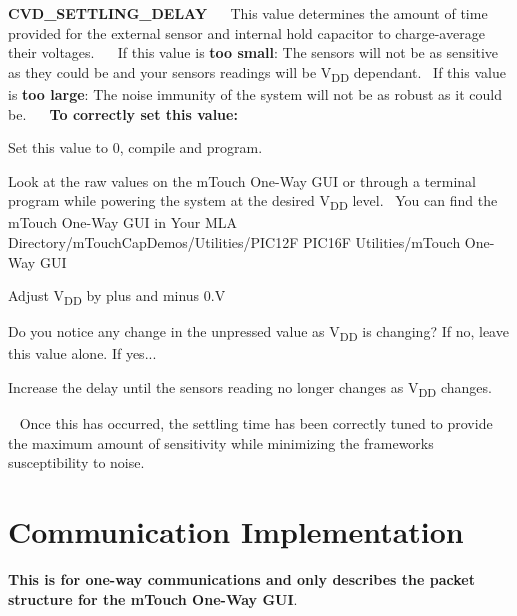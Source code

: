\begin{DoxyItemize}
\item {\bfseries C\+V\+D\+\_\+\+S\+E\+T\+T\+L\+I\+N\+G\+\_\+\+D\+E\+L\+A\+Y}~\newline
~\newline
 This value determines the amount of time provided for the external sensor and internal hold capacitor to charge-\/average their voltages.~\newline
~\newline
 If this value is {\bfseries too small}\+: The sensors will not be as sensitive as they could be and your sensor\textquotesingle{}s readings will be V\textsubscript{D\+D} dependant.~\newline
 If this value is {\bfseries too large}\+: The noise immunity of the system will not be as robust as it could be.~\newline
~\newline
 {\bfseries To correctly set this value\+:} 
\begin{DoxyEnumerate}
\item Set this value to 0, compile and program. 
\item Look at the raw values on the m\+Touch One-\/\+Way G\+U\+I or through a terminal program while powering the system at the desired V\textsubscript{D\+D} level.~\newline
 You can find the m\+Touch One-\/\+Way G\+U\+I in {\ttfamily Your M\+L\+A Directory/m\+Touch\+Cap\+Demos/\+Utilities/\+P\+I\+C12\+F P\+I\+C16\+F Utilities/m\+Touch One-\/\+Way G\+U\+I} 
\item Adjust V\textsubscript{D\+D} by plus and minus 0.\+V 
\begin{DoxyItemize}
\item Do you notice any change in the unpressed value as V\textsubscript{D\+D} is changing? If no, leave this value alone. If yes... 
\end{DoxyItemize}
\item Increase the delay until the sensor\textquotesingle{}s reading no longer changes as V\textsubscript{D\+D} changes. 
\end{DoxyEnumerate}~\newline
 Once this has occurred, the settling time has been correctly tuned to provide the maximum amount of sensitivity while minimizing the framework\textquotesingle{}s susceptibility to noise. \end{DoxyItemize}
\hypertarget{digCom}{}\section{Communication Implementation}\label{digCom}
{\bfseries This is for one-\/way communications and only describes the packet structure for the m\+Touch One-\/\+Way G\+U\+I}.

